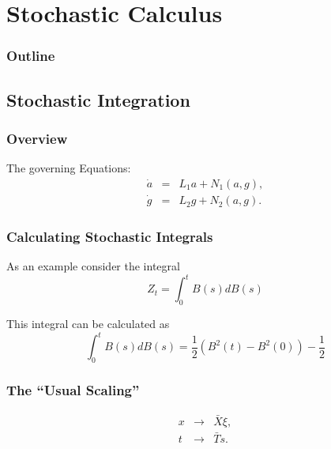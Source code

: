 


\section{Stochastic Calculus}
\begin{frame}
  \frametitle{Outline}
  \tableofcontents[ currentsection]
\end{frame}



\subsection{Stochastic Integration}

\begin{frame}
  \frametitle{Overview}

  The governing Equations:
  \begin{eqnarray*}
    \dot{a} & = & L_1a + N_1(a,g), \\
    \dot{g} & = & L_2g + N_2(a,g).
  \end{eqnarray*}


\end{frame}

\begin{frame}
	\frametitle{Calculating Stochastic Integrals}
		As an example consider the integral 
			$$Z_t=\int_0^t B(s) dB(s)$$
			
		This integral can be calculated as
			$$\displaystyle \int_0^t B(s)dB(s)=\frac{1}{2}(B^2(t)-B^2(0))-\frac{1}{2}$$
			
			
\end{frame}





\begin{frame}
  \frametitle{The ``Usual Scaling''}
  \begin{eqnarray*}
    x & \rightarrow & \bar{X} \xi, \\
    t & \rightarrow & \bar{T} s.
  \end{eqnarray*}

\end{frame}



